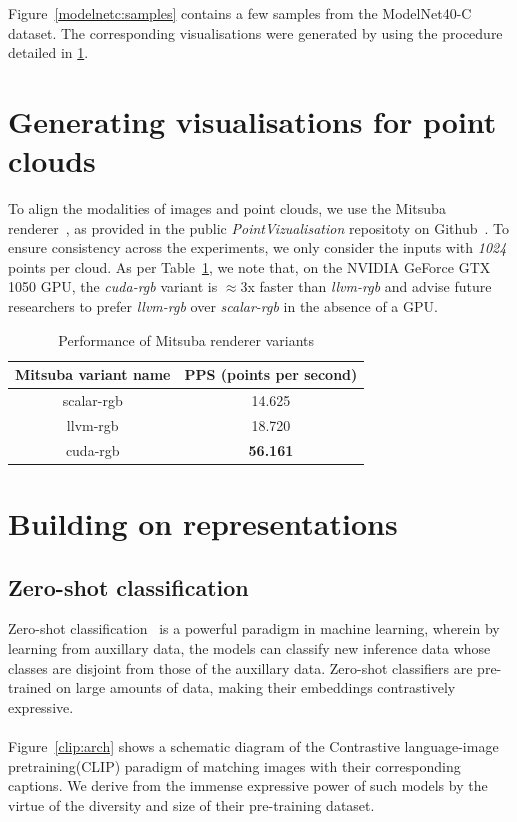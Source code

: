 \documentclass[letterpaper, 10 pt, conference]{ieeeconf}  %
\begin{document}
Figure~\ref{modelnetc:samples} contains a few samples from the ModelNet40-C dataset. The corresponding visualisations were generated by using the procedure detailed in \ref{mitsuba}.

\section{Generating visualisations for point clouds}
\label{mitsuba}
To align the modalities of images and point clouds, we use the Mitsuba renderer~\cite{10.1145/3355089.3356498}, as provided in the public \textit{PointVizualisation} repositoty on Github~\cite{pointvisualizaiton}. To ensure consistency across the experiments, we only consider the inputs with \textit{1024} points per cloud. As per Table~\ref{mitsuba:metrics}, we note that, on the NVIDIA GeForce GTX 1050 GPU, the \textit{cuda-rgb} variant is $\approx$3x faster than \textit{llvm-rgb} and advise future researchers to prefer \textit{llvm-rgb} over \textit{scalar-rgb} in the absence of a GPU. \\

\begin{table}[!h]
\vspace{-2mm}
\caption{Performance of Mitsuba renderer variants}
\vspace{-4mm}
\label{mitsuba:metrics}
\begin{center}
\begin{tabular}{|c|c|}
\hline
\textbf{Mitsuba variant name} & \textbf{PPS (points per second)} \\
\hline
scalar-rgb & 14.625 \\
\hline
llvm-rgb & 18.720 \\
\hline
cuda-rgb &  \textbf{56.161} \\
\hline
\end{tabular}
\end{center}
\vspace{-6mm}
\end{table}

\section{Building on representations}
\label{embeddings}

\subsection{Zero-shot classification}
\label{zero-shot:intro}
Zero-shot classification~\cite{10.1145/3293318} is a powerful paradigm in machine learning, wherein by learning from auxillary data, the models can classify new inference data whose classes are disjoint from those of the auxillary data. Zero-shot classifiers are pre-trained on large amounts of data, making their embeddings contrastively expressive. \\ \\
Figure~\ref{clip:arch} shows a schematic diagram of the Contrastive language-image pretraining(CLIP) paradigm of matching images with their corresponding captions. We derive from the immense expressive power of such models by the virtue of the diversity and size of their pre-training dataset.
\end{document}
